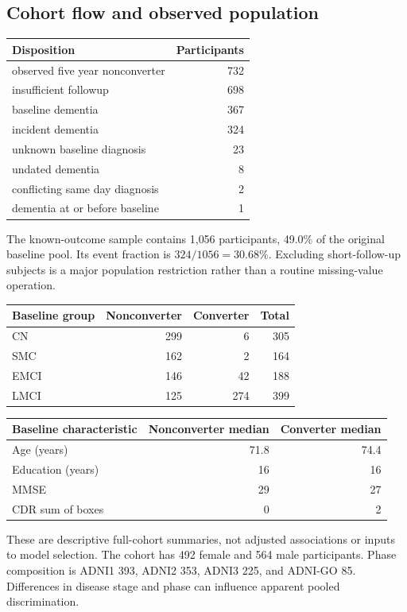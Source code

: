 \documentclass[11pt,a4paper]{article}
\begin{document}
\clearpage
\subsection{Cohort flow and observed population}
\begin{center}\small\renewcommand{\arraystretch}{1.15}
\begin{tabular}{p{.70\linewidth}r}\toprule
Disposition & Participants\\\midrule
observed five year nonconverter & 732\\
insufficient followup & 698\\
baseline dementia & 367\\
incident dementia & 324\\
unknown baseline diagnosis & 23\\
undated dementia & 8\\
conflicting same day diagnosis & 2\\
dementia at or before baseline & 1\\
\bottomrule\end{tabular}\end{center}
The known-outcome sample contains 1,056 participants, 49.0\% of the original baseline pool. Its event fraction is $324/1056=30.68\%$. Excluding short-follow-up subjects is a major population restriction rather than a routine missing-value operation.
\begin{center}\small\renewcommand{\arraystretch}{1.15}
\begin{tabular}{lrrr}\toprule
Baseline group & Nonconverter & Converter & Total\\\midrule
CN & 299 & 6 & 305\\
SMC & 162 & 2 & 164\\
EMCI & 146 & 42 & 188\\
LMCI & 125 & 274 & 399\\
\bottomrule\end{tabular}\end{center}
\begin{center}\small\renewcommand{\arraystretch}{1.15}
\begin{tabular}{p{.40\linewidth}rr}\toprule
Baseline characteristic & Nonconverter median & Converter median\\\midrule
Age (years) & 71.8 & 74.4\\
Education (years) & 16 & 16\\
MMSE & 29 & 27\\
CDR sum of boxes & 0 & 2\\
\bottomrule\end{tabular}\end{center}
These are descriptive full-cohort summaries, not adjusted associations or inputs to model selection. The cohort has 492 female and 564 male participants. Phase composition is ADNI1 393, ADNI2 353, ADNI3 225, and ADNI-GO 85. Differences in disease stage and phase can influence apparent pooled discrimination.
\end{document}
